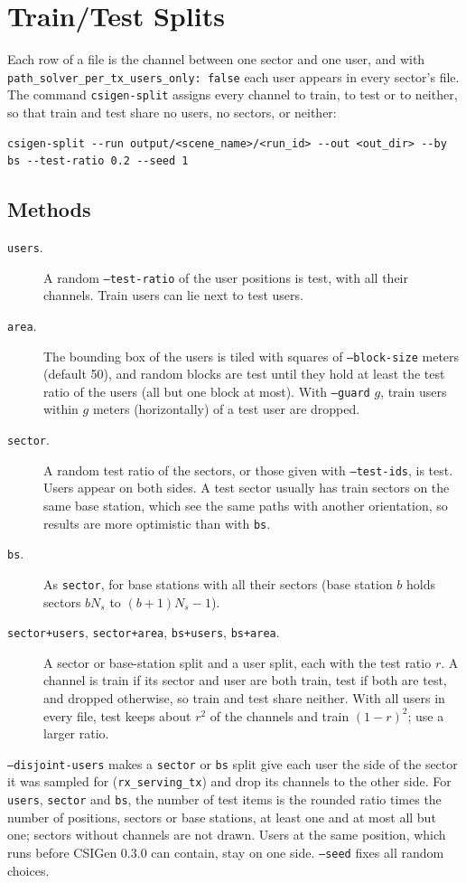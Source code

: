 \documentclass{article}
\newcommand{\key}[1]{\texttt{#1}}
\begin{document}
\clearpage
\section{Train/Test Splits}
\label{sec:splits}
Each row of a file is the channel between one sector and one user, and with \key{path\_solver\_per\_tx\_users\_only: false} each user appears in every sector's file. The command \texttt{csigen-split} assigns every channel to train, to test or to neither, so that train and test share no users, no sectors, or neither:
\begin{verbatim}
csigen-split --run output/<scene_name>/<run_id> --out <out_dir> --by bs --test-ratio 0.2 --seed 1
\end{verbatim}

\subsection{Methods}
\begin{description}
  \item[\texttt{users}.] A random \texttt{--test-ratio} of the user positions is test, with all their channels. Train users can lie next to test users.
  \item[\texttt{area}.] The bounding box of the users is tiled with squares of \texttt{--block-size} meters (default 50), and random blocks are test until they hold at least the test ratio of the users (all but one block at most). With \texttt{--guard} $g$, train users within $g$ meters (horizontally) of a test user are dropped.
  \item[\texttt{sector}.] A random test ratio of the sectors, or those given with \texttt{--test-ids}, is test. Users appear on both sides. A test sector usually has train sectors on the same base station, which see the same paths with another orientation, so results are more optimistic than with \texttt{bs}.
  \item[\texttt{bs}.] As \texttt{sector}, for base stations with all their sectors (base station $b$ holds sectors $b N_s$ to $(b+1) N_s - 1$).
  \item[\texttt{sector+users}, \texttt{sector+area}, \texttt{bs+users}, \texttt{bs+area}.] A sector or base-station split and a user split, each with the test ratio $r$. A channel is train if its sector and user are both train, test if both are test, and dropped otherwise, so train and test share neither. With all users in every file, test keeps about $r^2$ of the channels and train $(1-r)^2$; use a larger ratio.
\end{description}
\texttt{--disjoint-users} makes a \texttt{sector} or \texttt{bs} split give each user the side of the sector it was sampled for (\texttt{rx\_serving\_tx}) and drop its channels to the other side. For \texttt{users}, \texttt{sector} and \texttt{bs}, the number of test items is the rounded ratio times the number of positions, sectors or base stations, at least one and at most all but one; sectors without channels are not drawn. Users at the same position, which runs before CSIGen 0.3.0 can contain, stay on one side. \texttt{--seed} fixes all random choices.
\end{document}
